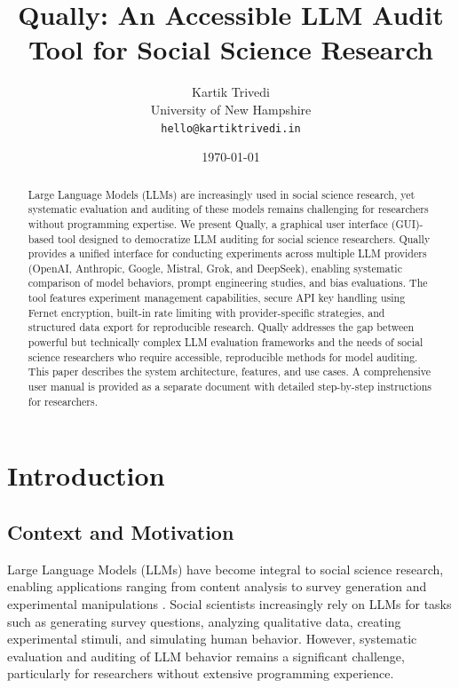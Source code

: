 \documentclass[11pt,a4paper]{article}
\title{Qually: An Accessible LLM Audit Tool for Social Science Research}
\author{Kartik Trivedi\\
\small University of New Hampshire\\
\small \texttt{hello@kartiktrivedi.in}}
\date{\today}
\begin{document}
\maketitle

\begin{abstract}
Large Language Models (LLMs) are increasingly used in social science research, yet systematic evaluation and auditing of these models remains challenging for researchers without programming expertise. We present Qually, a graphical user interface (GUI)-based tool designed to democratize LLM auditing for social science researchers. Qually provides a unified interface for conducting experiments across multiple LLM providers (OpenAI, Anthropic, Google, Mistral, Grok, and DeepSeek), enabling systematic comparison of model behaviors, prompt engineering studies, and bias evaluations. The tool features experiment management capabilities, secure API key handling using Fernet encryption, built-in rate limiting with provider-specific strategies, and structured data export for reproducible research. Qually addresses the gap between powerful but technically complex LLM evaluation frameworks and the needs of social science researchers who require accessible, reproducible methods for model auditing. This paper describes the system architecture, features, and use cases. A comprehensive user manual is provided as a separate document with detailed step-by-step instructions for researchers.
\end{abstract}

\section{Introduction}
\label{sec:introduction}

\subsection{Context and Motivation}

Large Language Models (LLMs) have become integral to social science research, enabling applications ranging from content analysis to survey generation and experimental manipulations \cite{github}. Social scientists increasingly rely on LLMs for tasks such as generating survey questions, analyzing qualitative data, creating experimental stimuli, and simulating human behavior. However, systematic evaluation and auditing of LLM behavior remains a significant challenge, particularly for researchers without extensive programming experience.
\end{document}
